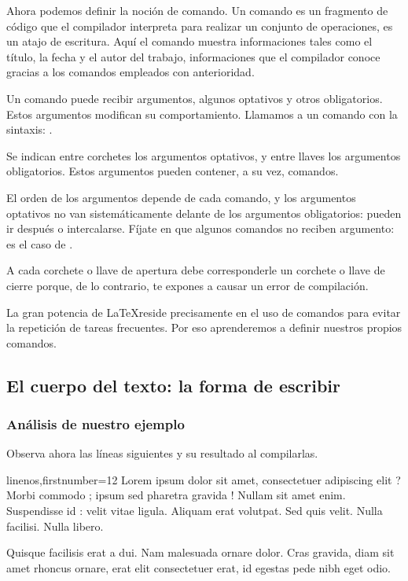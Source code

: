 Ahora podemos definir la noción de comando. Un comando es un fragmento de código que el compilador interpreta para realizar un conjunto de operaciones, es un atajo de escritura. 
Aquí el comando  muestra informaciones tales como el título, la fecha y el autor del trabajo, informaciones que el compilador conoce gracias a los comandos empleados con anterioridad.

Un comando puede recibir argumentos, algunos optativos y otros obligatorios. Estos argumentos modifican su comportamiento.
\label{syntaxecommande}Llamamos a un comando con la sintaxis: 
.

Se indican entre corchetes los argumentos optativos, y entre llaves los argumentos obligatorios. Estos argumentos pueden contener, a su vez, comandos.

El orden de los argumentos depende de cada comando, y los argumentos optativos no van sistemáticamente delante de los argumentos obligatorios: pueden ir después o intercalarse. Fíjate en que algunos comandos no reciben argumento: es el caso de .

\begin{attention}
A cada corchete o llave de apertura debe corresponderle un corchete o llave de cierre porque, de lo contrario, te expones a causar un error de compilación.
\end{attention}

La gran potencia de \LaTeX reside precisamente en el uso de comandos para evitar la repetición de tareas frecuentes. Por eso aprenderemos a definir nuestros propios comandos.



\subsection{El cuerpo del texto: la forma de escribir}

\subsubsection{Análisis de nuestro ejemplo}
Observa ahora las líneas siguientes y su resultado al compilarlas.


\begin{latexcode*}{linenos,firstnumber=12}
Lorem ipsum dolor sit amet, consectetuer adipiscing elit ?
Morbi commodo ; ipsum sed pharetra gravida !
Nullam sit amet enim. Suspendisse id : velit vitae ligula.
Aliquam erat volutpat.
Sed quis velit. Nulla facilisi. Nulla libero. 

Quisque facilisis erat a dui.
Nam malesuada ornare dolor.
Cras gravida, diam sit amet rhoncus ornare, 
erat      elit consectetuer erat, id egestas pede nibh eget odio.
\end{latexcode*}


